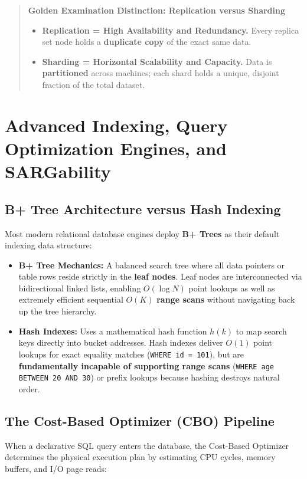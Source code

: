 \begin{quote}
\textbf{Golden Examination Distinction: Replication versus Sharding}
\begin{itemize}
    \item \textbf{Replication = High Availability and Redundancy.} Every replica set node holds a \textbf{duplicate copy} of the exact same data.
    \item \textbf{Sharding = Horizontal Scalability and Capacity.} Data is \textbf{partitioned} across machines; each shard holds a unique, disjoint fraction of the total dataset.
\end{itemize}
\end{quote}



\section{Advanced Indexing, Query Optimization Engines, and SARGability}
\label{sec:dbms_advanced_indexing}

\subsection{B+ Tree Architecture versus Hash Indexing}
Most modern relational database engines deploy \textbf{B+ Trees} as their default indexing data structure:
\begin{itemize}
    \item \textbf{B+ Tree Mechanics:} A balanced search tree where all data pointers or table rows reside strictly in the \textbf{leaf nodes}. Leaf nodes are interconnected via bidirectional linked lists, enabling $O(\log N)$ point lookups as well as extremely efficient sequential $O(K)$ \textbf{range scans} without navigating back up the tree hierarchy.
    \item \textbf{Hash Indexes:} Uses a mathematical hash function $h(k)$ to map search keys directly into bucket addresses. Hash indexes deliver $O(1)$ point lookups for exact equality matches (\texttt{WHERE id = 101}), but are \textbf{fundamentally incapable of supporting range scans} (\texttt{WHERE age BETWEEN 20 AND 30}) or prefix lookups because hashing destroys natural order.
\end{itemize}

\subsection{The Cost-Based Optimizer (CBO) Pipeline}
When a declarative SQL query enters the database, the Cost-Based Optimizer determines the physical execution plan by estimating CPU cycles, memory buffers, and I/O page reads:

